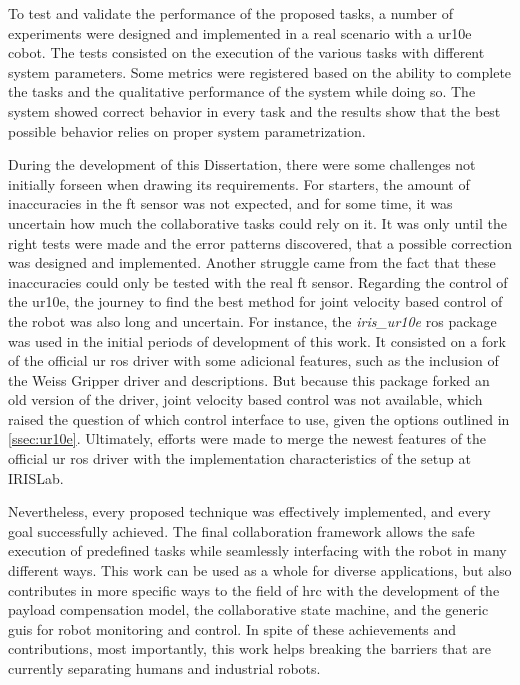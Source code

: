 \par To test and validate the performance of the proposed tasks, a number of experiments were designed and implemented in a real scenario with a \ac{ur10e} cobot. The tests consisted on the execution of the various tasks with different system parameters. Some metrics were registered based on the ability to complete the tasks and the qualitative performance of the system while doing so. The system showed correct behavior in every task and the results show that the best possible behavior relies on proper system parametrization.
\par During the development of this Dissertation, there were some challenges not initially forseen when drawing its requirements. For starters, the amount of inaccuracies in the \ac{ft} sensor was not expected, and for some time, it was uncertain how much the collaborative tasks could rely on it. It was only until the right tests were made and the error patterns discovered, that a possible correction was designed and implemented. Another struggle came from the fact that these inaccuracies could only be tested with the real \ac{ft} sensor. Regarding the control of the \ac{ur10e}, the journey to find the best method for joint velocity based control of the robot was also long and uncertain. For instance, the \textit{iris\_ur10e} \ac{ros} package was used in the initial periods of development of this work. It consisted on a fork of the official \ac{ur} \ac{ros} driver with some adicional features, such as the inclusion of the Weiss Gripper driver and descriptions. But because this package forked an old version of the driver, joint velocity based control was not available, which raised the question of which control interface to use, given the options outlined in \autoref{ssec:ur10e}. Ultimately, efforts were made to merge the newest features of the official \ac{ur} \ac{ros} driver with the implementation characteristics of the setup at IRISLab.
\par Nevertheless, every proposed technique was effectively implemented, and every goal successfully achieved. The final collaboration framework allows the safe execution of predefined tasks while seamlessly interfacing with the robot in many different ways. This work can be used as a whole for diverse applications, but also contributes in more specific ways to the field of \ac{hrc} with the development of the payload compensation model, the collaborative state machine, and the generic \acp{gui} for robot monitoring and control. In spite of these achievements and contributions, most importantly, this work helps breaking the barriers that are currently separating humans and industrial robots.





